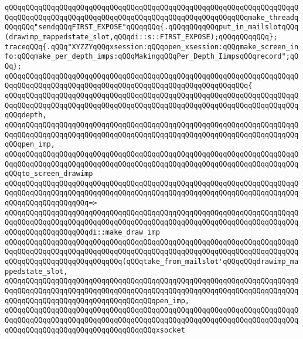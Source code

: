 \verb|qQQqqQQqqQQqqQQqqQQqqQQqqQQqqQQqqQQqqQQqqQQqqQQqqQQqqQQqqQQqqQQqqQQqqQQqqQQqqQQqqQQqqQQqqQQqqQQqqQQqqQQqqQQqqQQqqQQqqQQqqQQqqQQqmake_threadqQQqqQQq"sendqQQqFIRST_EXPOSE"qQQqqQQq{.qQQqqQQqqQQqput_in_mailslotqQQq(drawimp_mappedstate_slot,qQQqdi::s::FIRST_EXPOSE);qQQqqQQqqQQq};|\newline
\newline
\verb|traceqQQq{.qQQq"XYZZYqQQqxsession:qQQqopen_xsession:qQQqmake_screen_info:qQQqmake_per_depth_imps:qQQqMakingqQQqPer_Depth_IimpsqQQqrecord";qQQq};|\newline
\verb|qQQqqQQqqQQqqQQqqQQqqQQqqQQqqQQqqQQqqQQqqQQqqQQqqQQqqQQqqQQqqQQqqQQqqQQqqQQqqQQqqQQqqQQqqQQqqQQqqQQqqQQqqQQqqQQqqQQqqQQqqQQqqQQq{|\newline
\verb|qQQqqQQqqQQqqQQqqQQqqQQqqQQqqQQqqQQqqQQqqQQqqQQqqQQqqQQqqQQqqQQqqQQqqQQqqQQqqQQqqQQqqQQqqQQqqQQqqQQqqQQqqQQqqQQqqQQqqQQqqQQqqQQqqQQqqQQqqQQqqQQqdepth,|\newline
\verb|qQQqqQQqqQQqqQQqqQQqqQQqqQQqqQQqqQQqqQQqqQQqqQQqqQQqqQQqqQQqqQQqqQQqqQQqqQQqqQQqqQQqqQQqqQQqqQQqqQQqqQQqqQQqqQQqqQQqqQQqqQQqqQQqqQQqqQQqqQQqqQQqpen_imp,|\newline
\verb|qQQqqQQqqQQqqQQqqQQqqQQqqQQqqQQqqQQqqQQqqQQqqQQqqQQqqQQqqQQqqQQqqQQqqQQqqQQqqQQqqQQqqQQqqQQqqQQqqQQqqQQqqQQqqQQqqQQqqQQqqQQqqQQqqQQqqQQqqQQqqQQqto_screen_drawimp|\newline
\verb|qQQqqQQqqQQqqQQqqQQqqQQqqQQqqQQqqQQqqQQqqQQqqQQqqQQqqQQqqQQqqQQqqQQqqQQqqQQqqQQqqQQqqQQqqQQqqQQqqQQqqQQqqQQqqQQqqQQqqQQqqQQqqQQqqQQqqQQqqQQqqQQqqQQqqQQqqQQqqQQq=>|\newline
\verb|qQQqqQQqqQQqqQQqqQQqqQQqqQQqqQQqqQQqqQQqqQQqqQQqqQQqqQQqqQQqqQQqqQQqqQQqqQQqqQQqqQQqqQQqqQQqqQQqqQQqqQQqqQQqqQQqqQQqqQQqqQQqqQQqqQQqqQQqqQQqqQQqqQQqqQQqqQQqqQQqdi::make_draw_imp|\newline
\verb|qQQqqQQqqQQqqQQqqQQqqQQqqQQqqQQqqQQqqQQqqQQqqQQqqQQqqQQqqQQqqQQqqQQqqQQqqQQqqQQqqQQqqQQqqQQqqQQqqQQqqQQqqQQqqQQqqQQqqQQqqQQqqQQqqQQqqQQqqQQqqQQqqQQqqQQqqQQqqQQqqQQqqQQq(qQQqtake_from_mailslot'qQQqqQQqdrawimp_mappedstate_slot,|\newline
\verb|qQQqqQQqqQQqqQQqqQQqqQQqqQQqqQQqqQQqqQQqqQQqqQQqqQQqqQQqqQQqqQQqqQQqqQQqqQQqqQQqqQQqqQQqqQQqqQQqqQQqqQQqqQQqqQQqqQQqqQQqqQQqqQQqqQQqqQQqqQQqqQQqqQQqqQQqqQQqqQQqqQQqqQQqqQQqqQQqpen_imp,|\newline
\verb|qQQqqQQqqQQqqQQqqQQqqQQqqQQqqQQqqQQqqQQqqQQqqQQqqQQqqQQqqQQqqQQqqQQqqQQqqQQqqQQqqQQqqQQqqQQqqQQqqQQqqQQqqQQqqQQqqQQqqQQqqQQqqQQqqQQqqQQqqQQqqQQqqQQqqQQqqQQqqQQqqQQqqQQqqQQqqQQqxsocket|\newline

